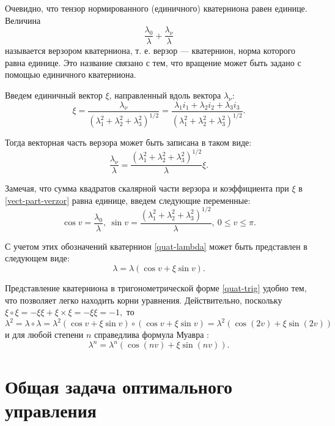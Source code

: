 \documentclass[14pt]{extreport}
\begin{document}
Очевидно, что тензор нормированного (единичного) кватерниона равен единице. Величина
$$\dfrac{\lambda_{0}}{\lambda} + \dfrac{\lambda_{\nu}}{\lambda}$$
называется верзором кватерниона, т. е. верзор — кватернион, норма которого равна единице. Это название связано с тем, что вращение может быть задано с помощью единичного кватерниона.

Введем единичный вектор $\xi$, направленный вдоль вектора $\lambda_{\nu}$:
\begin{equation}
\xi=\dfrac{\lambda_{\nu}}{(\lambda_{1}^{2}+\lambda_{2}^{2}+\lambda_{3}^{2})^{1/2}}=\dfrac{\lambda_{1}i_{1} + \lambda_{2}i_{2} + \lambda_{3}i_{3}}{(\lambda_{1}^{2}+\lambda_{2}^{2}+\lambda_{3}^{2})^{1/2}}.
\end{equation}

Тогда векторная часть верзора может быть записана в таком виде:
\begin{equation}
\label{vect-part-verzor}
\dfrac{\lambda_{\nu}}{\lambda}=\dfrac{(\lambda_{1}^{2}+\lambda_{2}^{2}+\lambda_{3}^{2})^{1/2}}{\lambda}\xi.
\end{equation}

Замечая, что сумма квадратов скалярной части верзора и коэффициента при $\xi$ в \eqref{vect-part-verzor} равна единице, введем следующие переменные:
\begin{equation}
\cos v=\dfrac{\lambda_{0}}{\lambda},\ \sin v=\dfrac{(\lambda_{1}^{2}+\lambda_{2}^{2}+\lambda_{3}^{2})^{1/2}}{\lambda},\ 0\leq v \leq \pi.
\end{equation}

С учетом этих обозначений кватернион \eqref{quat-lambda} может быть представлен в следующем виде:
\begin{equation}
\label{quat-trig}
\lambda=\lambda(\cos v + \xi \sin v).
\end{equation}

Представление кватерниона в тригонометрической форме \eqref{quat-trig} удобно тем, что позволяет легко находить корни уравнения. Действительно, поскольку $\xi \circ \xi = -\xi \xi + \xi \times \xi = -\xi \xi = -1,$ то
\begin{equation}
\lambda^{2}=\lambda \circ \lambda = \lambda^{2}(\cos v + \xi \sin v) \circ (\cos v + \xi \sin v) = \lambda^{2}(\cos (2v)+\xi \sin(2v))
\end{equation}
и для любой степени $n$ справедлива формула Муавра \cite{matan}:
\begin{equation}
\lambda^{n}=\lambda^{n}(\cos(nv)+\xi\sin(nv)).
\end{equation}
\chapter{Общая задача оптимального управления}
\end{document}
